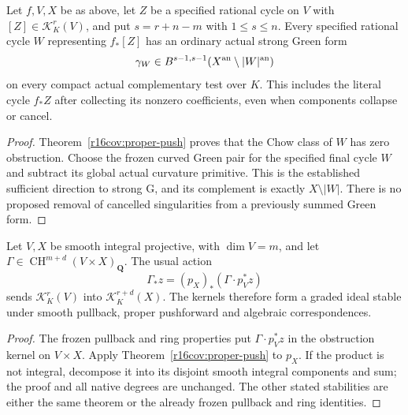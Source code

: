 \begin{corollary}
\label{r16cov:push-G}
Let $f,V,X$ be as above, let $Z$ be a specified rational cycle on
$V$ with $[Z]\in\mathcal K_K^r(V)$, and put $s=r+n-m$ with
$1\leq s\leq n$.  Every specified rational cycle $W$ representing
$f_*[Z]$ has an ordinary actual strong Green form
\[
 \gamma_W\in B^{s-1,s-1}
        (X^{\rm an}\setminus|W|^{\rm an})
\]
on every compact actual complementary test over $K$.
This includes the literal cycle $f_*Z$ after collecting its
nonzero coefficients, even when components collapse or cancel.
\end{corollary}

\begin{proof}
Theorem~\ref{r16cov:proper-push} proves that the Chow class of $W$
has zero obstruction.  Choose the frozen curved Green pair for
the specified final cycle $W$ and subtract its global actual
curvature primitive.  This is the established sufficient
direction to strong G, and its complement is exactly $X\setminus|W|$.
There is no proposed removal of cancelled singularities from a
previously summed Green form.
\end{proof}

\begin{proposition}
\label{r16cov:correspondences}
Let $V,X$ be smooth integral projective, with $\dim V=m$, and let
$\Gamma\in\operatorname{CH}^{m+d}(V\times X)_{\mathbf Q}$.
The usual action
\[
 \Gamma_*z=(p_X)_*(\Gamma\cdot p_V^*z)
\]
sends $\mathcal K_K^r(V)$ into $\mathcal K_K^{r+d}(X)$.
The kernels therefore form a graded ideal stable under smooth
pullback, proper pushforward and algebraic correspondences.
\end{proposition}

\begin{proof}
The frozen pullback and ring properties put
$\Gamma\cdot p_V^*z$ in the obstruction kernel on $V\times X$.
Apply Theorem~\ref{r16cov:proper-push} to $p_X$.
If the product is not integral, decompose it into its disjoint
smooth integral components and sum; the proof and all native
degrees are unchanged.  The other stated stabilities are either
the same theorem or the already frozen pullback and ring identities.
\end{proof}

